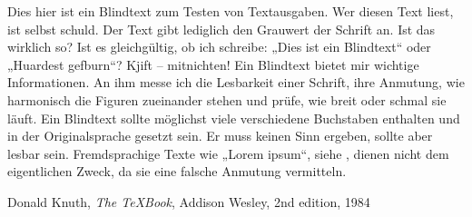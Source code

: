 \documentclass[12pt,ngerman]{scrartcl}
\begin{document}
\blindtext

Dies hier ist ein Blindtext zum Testen von Textausgaben. Wer diesen Text liest, ist selbst schuld. Der Text gibt lediglich den Grauwert der Schrift an. Ist das wirklich so? Ist es gleichgültig, ob ich schreibe: „Dies ist ein Blindtext“ oder „Huardest gefburn“? Kjift – mitnichten! Ein Blindtext bietet mir wichtige Informationen. An ihm messe ich die Lesbarkeit einer Schrift, ihre Anmutung, wie harmonisch die Figuren zueinander stehen und prüfe, wie breit oder schmal sie läuft. Ein Blindtext sollte möglichst viele verschiedene Buchstaben enthalten und in der Originalsprache gesetzt sein. Er muss keinen Sinn ergeben, sollte aber lesbar sein. Fremdsprachige Texte wie „Lorem ipsum“, siehe \cite{knuth}, dienen nicht dem eigentlichen Zweck, da sie eine falsche Anmutung vermitteln.

\begin{thebibliography}{9}
 Donald Knuth, \textit{The \TeX Book}, Addison Wesley, 2nd edition, 1984
\end{thebibliography}
\end{document}
